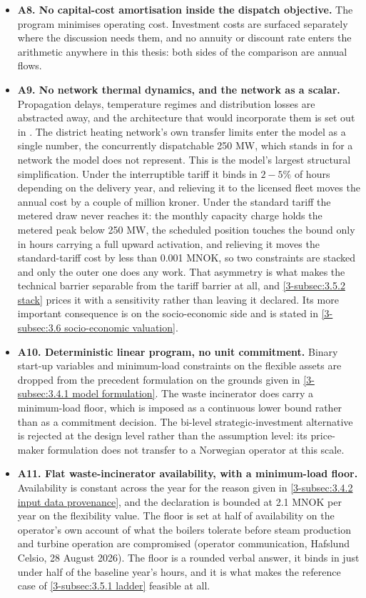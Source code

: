 \begin{itemize}
    \item \textbf{A8. No capital-cost amortisation inside the dispatch objective.} The program minimises operating cost. Investment costs are surfaced separately where the discussion needs them, and no annuity or discount rate enters the arithmetic anywhere in this thesis: both sides of the comparison are annual flows.

    \item \textbf{A9. No network thermal dynamics, and the network as a scalar.} Propagation delays, temperature regimes and distribution losses are abstracted away, and the architecture that would incorporate them is set out in \cite{vandermeulen_controlling_2018}. The district heating network's own transfer limits enter the model as a single number, the concurrently dispatchable 250 MW, which stands in for a network the model does not represent. This is the model's largest structural simplification. Under the interruptible tariff it binds in $2 - 5\%$ of hours depending on the delivery year, and relieving it to the licensed fleet moves the annual cost by a couple of million kroner. Under the standard tariff the metered draw never reaches it: the monthly capacity charge holds the metered peak below 250 MW, the scheduled position touches the bound only in hours carrying a full upward activation, and relieving it moves the standard-tariff cost by less than 0.001 MNOK, so two constraints are stacked and only the outer one does any work. That asymmetry is what makes the technical barrier separable from the tariff barrier at all, and \autoref{3-subsec:3.5.2 stack} prices it with a sensitivity rather than leaving it declared. Its more important consequence is on the socio-economic side and is stated in \autoref{3-subsec:3.6 socio-economic valuation}.

    \item \textbf{A10. Deterministic linear program, no unit commitment.} Binary start-up variables and minimum-load constraints on the flexible assets are dropped from the precedent formulation \cite{kirkerud_impacts_2016} on the grounds given in \autoref{3-subsec:3.4.1 model formulation}. The waste incinerator does carry a minimum-load floor, which is imposed as a continuous lower bound rather than as a commitment decision. The bi-level strategic-investment alternative \cite{tan_strategic_2022} is rejected at the design level rather than the assumption level: its price-maker formulation does not transfer to a Norwegian operator at this scale.

    \item \textbf{A11. Flat waste-incinerator availability, with a minimum-load floor.} Availability is constant across the year for the reason given in \autoref{3-subsec:3.4.2 input data provenance}, and the declaration is bounded at 2.1 MNOK per year on the flexibility value. The floor is set at half of availability on the operator's own account of what the boilers tolerate before steam production and turbine operation are compromised (operator communication, Hafslund Celsio, 28 August 2026). The floor is a rounded verbal answer, it binds in just under half of the baseline year's hours, and it is what makes the reference case of \autoref{3-subsec:3.5.1 ladder} feasible at all.


\end{itemize}

